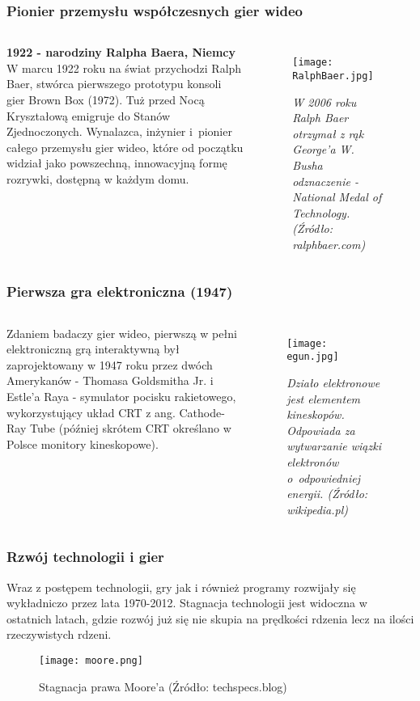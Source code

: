 \documentclass{beamer}
\begin{document}
\begin{frame}
\frametitle{Pionier przemysłu współczesnych gier wideo}
    \begin{columns}[c]
            \textbf{1922 - narodziny Ralpha Baera,
            Niemcy}\\
            W marcu 1922 roku na świat przychodzi Ralph Baer, stwórca pierwszego prototypu konsoli gier Brown Box (1972). Tuż przed Nocą Kryształową emigruje do Stanów Zjednoczonych. Wynalazca, inżynier i~pionier całego przemysłu gier wideo, które od początku widział jako powszechną, innowacyjną formę rozrywki, dostępną w każdym domu.
            \begin{figure}
            \texttt{[image: RalphBaer.jpg]}
            \caption{\textit{W 2006 roku Ralph Baer otrzymał z rąk George'a W. Busha odznaczenie - National Medal of Technology. (Źródło: ralphbaer.com)}}
            \end{figure}
    \end{columns}
\end{frame}


\begin{frame}
\frametitle{Pierwsza gra elektroniczna (1947)}
    \begin{columns}[c]
            Zdaniem badaczy gier wideo, pierwszą w pełni elektroniczną grą interaktywną był zaprojektowany w 1947 roku przez dwóch Amerykanów - Thomasa Goldsmitha Jr. i Estle'a Raya - symulator pocisku rakietowego, wykorzystujący układ CRT z ang. Cathode-Ray Tube (później skrótem CRT określano w Polsce monitory kineskopowe).
            \begin{figure}
                \texttt{[image: egun.jpg]}
                \caption{\textit{Działo elektronowe jest elementem kineskopów. Odpowiada za wytwarzanie wiązki elektronów o~odpowiedniej energii. (Źródło: wikipedia.pl)}}
            \end{figure}
    \end{columns}
\end{frame}


\begin{frame}
\frametitle{Rzwój technologii i gier}
    Wraz z postępem technologii, gry jak i również programy rozwijały się wykładniczo przez lata 1970-2012. Stagnacja technologii jest widoczna w ostatnich latach, gdzie rozwój już się nie skupia na prędkości rdzenia lecz na ilości rzeczywistych rdzeni.
    \begin{figure}
    \texttt{[image: moore.png]}
                \caption{\small{Stagnacja prawa Moore'a (Źródło: techspecs.blog)}}
            \end{figure}
\end{frame}
\end{document}
